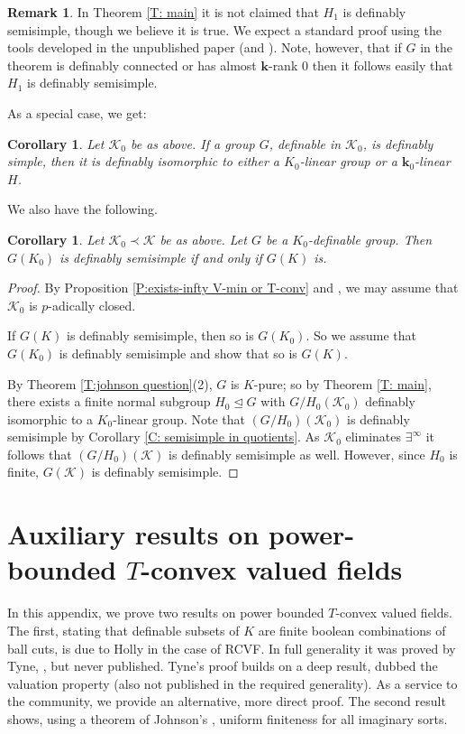 \documentclass[11pt]{amsart}
\newtheorem{corollary}[theorem]{Corollary}
\theoremstyle{definition}
\newtheorem{remark}[theorem]{Remark}
\newcommand{\bk}{\textbf{k}}
\newcommand{\CK}{{\mathcal K}}
\newcommand{\0}{\emptyset}
\begin{document}
\begin{remark}\label{R: result is ss}
In Theorem \ref{T: main} it is not claimed that $H_1$ is definably semisimple, though we believe it is true. We expect a standard proof using the tools developed in the unpublished paper \cite{GisHalMac} (and \cite[\S 6]{AcHa}). Note, however, that if $G$ in the theorem is definably connected  or has almost $\bk$-rank  $0$ then it follows easily that $H_1$ is definably semisimple.
\end{remark}

As a special case, we get: 
\begin{corollary}
    Let $\CK_0$ be as above. If a group $G$, definable in $\CK_0$,  is definably simple, then it is definably isomorphic to either a $K_0$-linear group or a  $\bk_0$-linear $H$. 
\end{corollary}


We also have the following.

\begin{corollary}\label{C: ss is fo} 
Let $\CK_0\prec  \CK$ be as above.
    Let  $G$ be a $K_0$-definable group. Then $G(K_0)$ is definably semisimple  if and only if $G(K)$ is. 
\end{corollary}
\begin{proof} 
    By Proposition \ref{P:exists-infty V-min or T-conv} and  \cite[\S 3]{JohCminimalexist}, we may assume that $\CK_0$ is $p$-adically closed.
    
   
      
    If $G(K)$ is definably semisimple, then so is $G(K_0)$.  So we assume that $G(K_0)$ is  definably semisimple and show that so is $G(K)$.
    

     By Theorem \ref{T:johnson question}(2),  $G$ is $K$-pure; so by Theorem \ref{T: main}, there exists a finite normal subgroup $H_0\trianglelefteq G$ with $G/H_0 (\CK_0)$ definably isomorphic to a $K_0$-linear group. Note that $(G/H_0)(\CK_0)$ is  definably semisimple by Corollary \ref{C: semisimple in quotients}. As $\CK_0$ eliminates $\exists^\infty$ it follows that $(G/H_0)(\CK)$ is definably semisimple as well. However, since $H_0$ is finite,  $G(\CK)$ is definably semisimple.  
\end{proof}



\appendix
\section{Auxiliary results on power-bounded $T$-convex valued fields}
In this appendix, we prove two results on power bounded $T$-convex valued fields. The first, stating that definable subsets of $K$ are finite boolean combinations of ball cuts, is due to Holly \cite[Theorem 4.8]{holly} in the case of RCVF. In full generality it was proved by Tyne,  \cite[Page 94]{tynephd}, but never published. Tyne's proof builds on a deep result, dubbed the valuation property (also not published in the required generality). As a service to the community, we provide an alternative, more direct  proof. The second result shows, using a theorem of Johnson's \cite{JohCminimalexist}, uniform finiteness for all imaginary sorts.
\end{document}
